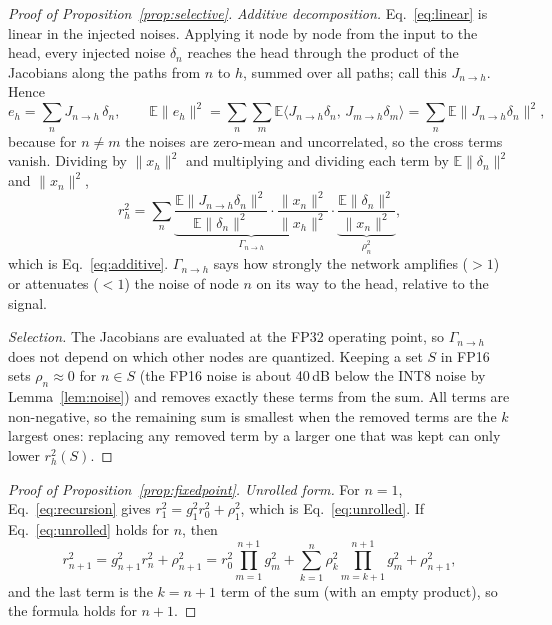 \documentclass[pdflatex,sn-mathphys-num]{sn-jnl}%
\theoremstyle{thmstyleone}%
\theoremstyle{thmstyletwo}%
\theoremstyle{thmstylethree}%
\begin{document}
\begin{appendices}
\begin{proof}[Proof of Proposition~\ref{prop:selective}]
\emph{Additive decomposition.} Eq.~\eqref{eq:linear} is linear in the injected noises. Applying it node by node from the input to the head, every injected noise $\delta_n$ reaches the head through the product of the Jacobians along the paths from $n$ to $h$, summed over all paths; call this $J_{n\to h}$. Hence
\begin{equation*}
e_h=\sum_n J_{n\to h}\,\delta_n,\qquad
\mathbb{E}\lVert e_h\rVert^2=\sum_n\sum_m\mathbb{E}\big\langle J_{n\to h}\delta_n,\,J_{m\to h}\delta_m\big\rangle=\sum_n\mathbb{E}\lVert J_{n\to h}\delta_n\rVert^2,
\end{equation*}
because for $n\neq m$ the noises are zero-mean and uncorrelated, so the cross terms vanish. Dividing by $\lVert x_h\rVert^2$ and multiplying and dividing each term by $\mathbb{E}\lVert\delta_n\rVert^2$ and $\lVert x_n\rVert^2$,
\begin{equation*}
r_h^2=\sum_n\underbrace{\frac{\mathbb{E}\lVert J_{n\to h}\delta_n\rVert^2}{\mathbb{E}\lVert\delta_n\rVert^2}\cdot\frac{\lVert x_n\rVert^2}{\lVert x_h\rVert^2}}_{\Gamma_{n\to h}}\cdot\underbrace{\frac{\mathbb{E}\lVert\delta_n\rVert^2}{\lVert x_n\rVert^2}}_{\rho_n^2},
\end{equation*}
which is Eq.~\eqref{eq:additive}. $\Gamma_{n\to h}$ says how strongly the network amplifies ($>1$) or attenuates ($<1$) the noise of node $n$ on its way to the head, relative to the signal.

\emph{Selection.} The Jacobians are evaluated at the FP32 operating point, so $\Gamma_{n\to h}$ does not depend on which other nodes are quantized. Keeping a set $S$ in FP16 sets $\rho_n\approx0$ for $n\in S$ (the FP16 noise is about 40\,dB below the INT8 noise by Lemma~\ref{lem:noise}) and removes exactly these terms from the sum. All terms are non-negative, so the remaining sum is smallest when the removed terms are the $k$ largest ones: replacing any removed term by a larger one that was kept can only lower $r_h^2(S)$.
\end{proof}

\begin{proof}[Proof of Proposition~\ref{prop:fixedpoint}]
\emph{Unrolled form.} For $n=1$, Eq.~\eqref{eq:recursion} gives $r_1^2=g_1^2r_0^2+\rho_1^2$, which is Eq.~\eqref{eq:unrolled}. If Eq.~\eqref{eq:unrolled} holds for $n$, then
\begin{equation*}
r_{n+1}^2=g_{n+1}^2r_n^2+\rho_{n+1}^2=r_0^2\prod_{m=1}^{n+1}g_m^2+\sum_{k=1}^{n}\rho_k^2\prod_{m=k+1}^{n+1}g_m^2+\rho_{n+1}^2,
\end{equation*}
and the last term is the $k=n+1$ term of the sum (with an empty product), so the formula holds for $n+1$.


\end{proof}
\end{appendices}
\end{document}
